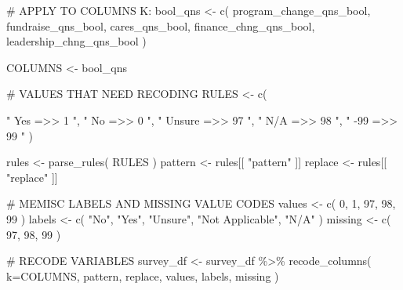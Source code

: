 \documentclass[
  letterpaper,
]{scrbook}
\newenvironment{Shaded}{\begin{snugshade}}{\end{snugshade}}
\newcommand{\AttributeTok}[1]{\textcolor[rgb]{0.40,0.45,0.13}{#1}}
\newcommand{\CommentTok}[1]{\textcolor[rgb]{0.37,0.37,0.37}{#1}}
\newcommand{\DecValTok}[1]{\textcolor[rgb]{0.68,0.00,0.00}{#1}}
\newcommand{\FunctionTok}[1]{\textcolor[rgb]{0.28,0.35,0.67}{#1}}
\newcommand{\NormalTok}[1]{\textcolor[rgb]{0.00,0.23,0.31}{#1}}
\newcommand{\OtherTok}[1]{\textcolor[rgb]{0.00,0.23,0.31}{#1}}
\newcommand{\SpecialCharTok}[1]{\textcolor[rgb]{0.37,0.37,0.37}{#1}}
\newcommand{\StringTok}[1]{\textcolor[rgb]{0.13,0.47,0.30}{#1}}
\begin{document}
\begin{Shaded}
\begin{Highlighting}[]
\CommentTok{\# APPLY TO COLUMNS K:}
\NormalTok{bool\_qns }\OtherTok{\textless{}{-}} 
  \FunctionTok{c}\NormalTok{( program\_change\_qns\_bool, }
\NormalTok{     fundraise\_qns\_bool, }
\NormalTok{     cares\_qns\_bool, }
\NormalTok{     finance\_chng\_qns\_bool, }
\NormalTok{     leadership\_chng\_qns\_bool )}

\NormalTok{COLUMNS }\OtherTok{\textless{}{-}}\NormalTok{  bool\_qns}

\CommentTok{\# VALUES THAT NEED RECODING}
\NormalTok{RULES }\OtherTok{\textless{}{-}} \FunctionTok{c}\NormalTok{(}
  
           \StringTok{"  Yes    =\textgreater{}\textgreater{}    1    "}\NormalTok{, }
           \StringTok{"  No     =\textgreater{}\textgreater{}    0    "}\NormalTok{, }
           \StringTok{"  Unsure =\textgreater{}\textgreater{}    97   "}\NormalTok{, }
           \StringTok{"  N/A    =\textgreater{}\textgreater{}    98   "}\NormalTok{, }
           \StringTok{"  {-}99    =\textgreater{}\textgreater{}    99   "}\NormalTok{   )}

\NormalTok{rules }\OtherTok{\textless{}{-}} \FunctionTok{parse\_rules}\NormalTok{( RULES )          }
\NormalTok{pattern }\OtherTok{\textless{}{-}}\NormalTok{ rules[[ }\StringTok{"pattern"}\NormalTok{ ]]}
\NormalTok{replace }\OtherTok{\textless{}{-}}\NormalTok{ rules[[ }\StringTok{"replace"}\NormalTok{ ]]}


\CommentTok{\# MEMISC LABELS AND MISSING VALUE CODES}
\NormalTok{values  }\OtherTok{\textless{}{-}} \FunctionTok{c}\NormalTok{( }\DecValTok{0}\NormalTok{, }\DecValTok{1}\NormalTok{, }\DecValTok{97}\NormalTok{, }\DecValTok{98}\NormalTok{, }\DecValTok{99}\NormalTok{ )}
\NormalTok{labels  }\OtherTok{\textless{}{-}} \FunctionTok{c}\NormalTok{( }\StringTok{"No"}\NormalTok{, }\StringTok{"Yes"}\NormalTok{, }\StringTok{"Unsure"}\NormalTok{, }\StringTok{"Not Applicable"}\NormalTok{, }\StringTok{"N/A"}\NormalTok{ )}
\NormalTok{missing }\OtherTok{\textless{}{-}} \FunctionTok{c}\NormalTok{( }\DecValTok{97}\NormalTok{, }\DecValTok{98}\NormalTok{, }\DecValTok{99}\NormalTok{ )}

\CommentTok{\# RECODE VARIABLES }
\NormalTok{survey\_df }\OtherTok{\textless{}{-}} 
\NormalTok{  survey\_df }\SpecialCharTok{\%\textgreater{}\%} 
  \FunctionTok{recode\_columns}\NormalTok{( }\AttributeTok{k=}\NormalTok{COLUMNS, pattern, replace, values, labels, missing )}
\end{Highlighting}
\end{Shaded}
\end{document}
